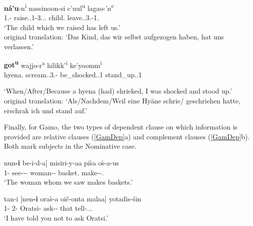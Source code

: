 \begin{exe}\ex\label{KabDep}
\begin{xlist}
\raggedright
\ex\gll \textbf{n\'a'u}-n\textsuperscript{i} nassinoon-si c'uul\textsuperscript{u} lagao-'n\textsuperscript{e}\\
1\pl{}.\nom{}-\emphat{} raise.\pfv{}.1\pl{}-3\sg{}.\mas{}.\obj{}.\relativ{} child.\nom{} leave.\pfv{}.3\sg{}.\mas{}-1\pl{}.\obj{}\\
\glt `The child which we raised has left us.'\\
original translation: `Das Kind, das wir selbst aufgezogen haben, hat uns verlassen.' %

\ex\gll \textbf{got\textsuperscript{u}} wajjo-r\textsuperscript{a} hilikk'\textsuperscript{i} ke'yoomm\textsuperscript{i}\\
hyena.\nom{} scream.\pfv{}.3\sg{}.\mas{}-\tmp{} be\_shocked.\cvb{}.1\sg{} stand\_up.\pfv{}.1\sg{}\\
\begin{sloppypar}\glt  `When/After/Because a hyena (had) shrieked, I was shocked and stood up.' %
\\
original translation: `Als/Nachdem/Weil eine Hy\"{a}ne schrie/ ge\-schrie\-hen hatte, erschrak ich und stand auf.' \end{sloppypar} %
\end{xlist}
\end{exe}

Finally, for Gamo, the two types of dependent clause on which information is provided are relative clauses (\ref{GamDep}a) and complement clauses (\ref{GamDep}b). 
Both mark subjects in the Nominative  case.

\begin{exe}\ex\label{GamDep}
\begin{xlist}
\raggedright
\ex\gll {\rm [}nun\textbf{-i} be\textglotstop-i-d-a{\rm ]} misiri-y-aa pi\`sa o\`s-a-us\\
        \hspaceThis{[}1\pl{}-\nom{} see-\persm-\tns{}-\complx{} woman--\nom{} basket.\acc{} make-\persm-\tns{}.\complx{}\\
\glt `The woman whom we saw makes baskets.'

\ex\gll tan-i {\rm [}nen\textbf{-i} ora\`s-a oi\v c-onta malaa{\rm ]} yotadis-\v sin\\
1\sg{}-\nom{} \hspaceThis{[}2\sg{}-\nom{} Oratsi-\acc{} ask-\Neg{}-\Inf{} that tell-\persm.\tns{}.\complx{}.\aux{}\\
\glt `I have told you not to ask Oratsi.'
\end{xlist}
\end{exe}


